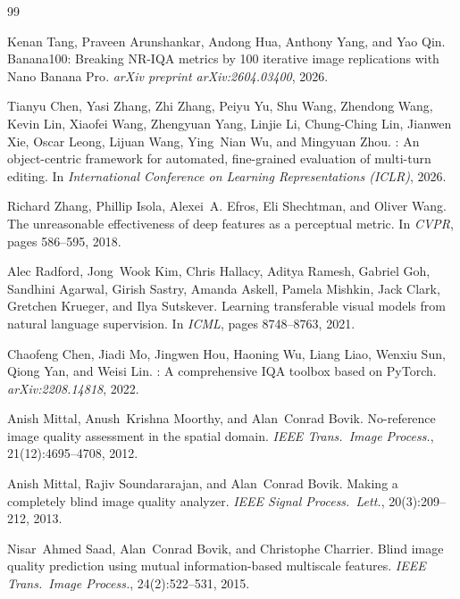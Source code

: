 \documentclass[sigconf]{acmart}
\begin{document}
\begin{thebibliography}{99}

Kenan Tang, Praveen Arunshankar, Andong Hua, Anthony Yang, and Yao Qin.
\newblock Banana100: Breaking {NR-IQA} metrics by 100 iterative image
  replications with {Nano Banana Pro}.
\newblock \textit{arXiv preprint arXiv:2604.03400}, 2026.

Tianyu Chen, Yasi Zhang, Zhi Zhang, Peiyu Yu, Shu Wang, Zhendong Wang,
  Kevin Lin, Xiaofei Wang, Zhengyuan Yang, Linjie Li, Chung-Ching Lin,
  Jianwen Xie, Oscar Leong, Lijuan Wang, Ying~Nian Wu, and Mingyuan Zhou.
: An object-centric framework for automated,
  fine-grained evaluation of multi-turn editing.
\newblock In \textit{International Conference on Learning Representations
  (ICLR)}, 2026.

Richard Zhang, Phillip Isola, Alexei~A. Efros, Eli Shechtman, and
  Oliver Wang.
\newblock The unreasonable effectiveness of deep features as a perceptual
  metric.
\newblock In \textit{CVPR}, pages 586--595, 2018.

Alec Radford, Jong~Wook Kim, Chris Hallacy, Aditya Ramesh, Gabriel Goh,
  Sandhini Agarwal, Girish Sastry, Amanda Askell, Pamela Mishkin, Jack Clark,
  Gretchen Krueger, and Ilya Sutskever.
\newblock Learning transferable visual models from natural language supervision.
\newblock In \textit{ICML}, pages 8748--8763, 2021.

Chaofeng Chen, Jiadi Mo, Jingwen Hou, Haoning Wu, Liang Liao, Wenxiu Sun,
  Qiong Yan, and Weisi Lin.
: A comprehensive {IQA} toolbox based on {PyTorch}.
\newblock \textit{arXiv:2208.14818}, 2022.

Anish Mittal, Anush~Krishna Moorthy, and Alan~Conrad Bovik.
\newblock No-reference image quality assessment in the spatial domain.
\newblock \textit{IEEE Trans.\ Image Process.}, 21(12):4695--4708, 2012.

Anish Mittal, Rajiv Soundararajan, and Alan~Conrad Bovik.
\newblock Making a completely blind image quality analyzer.
\newblock \textit{IEEE Signal Process.\ Lett.}, 20(3):209--212, 2013.

Nisar~Ahmed Saad, Alan~Conrad Bovik, and Christophe Charrier.
\newblock Blind image quality prediction using mutual information-based
  multiscale features.
\newblock \textit{IEEE Trans.\ Image Process.}, 24(2):522--531, 2015.


\end{thebibliography}
\end{document}
